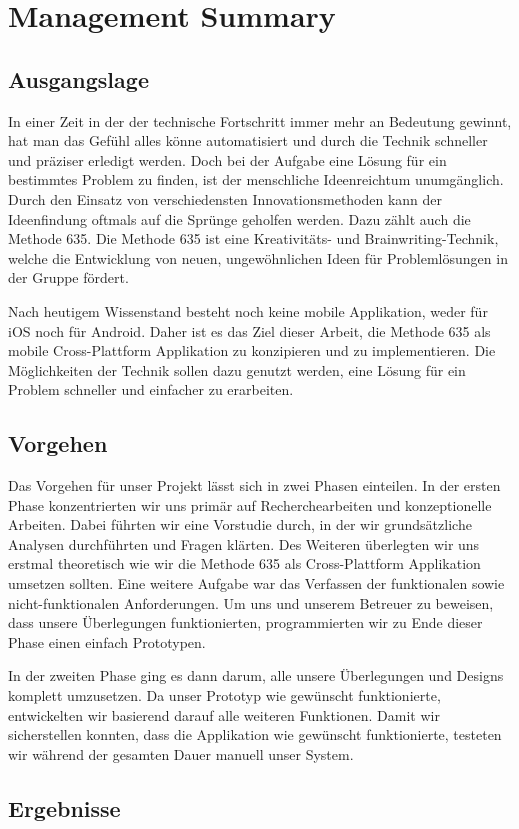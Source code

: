 \section{Management Summary}

\subsection{Ausgangslage}
In einer Zeit in der der technische Fortschritt immer mehr an Bedeutung gewinnt, hat man das Gefühl alles könne automatisiert und durch die Technik schneller und präziser erledigt werden. Doch bei der Aufgabe eine Lösung für ein bestimmtes Problem zu finden, ist der menschliche Ideenreichtum unumgänglich. Durch den Einsatz von verschiedensten Innovationsmethoden kann der Ideenfindung oftmals auf die Sprünge geholfen werden. Dazu zählt auch die Methode 635. Die Methode 635 ist eine Kreativitäts- und Brainwriting-Technik, welche die Entwicklung von neuen, ungewöhnlichen Ideen für Problemlösungen in der Gruppe fördert.

Nach heutigem Wissenstand besteht noch keine mobile Applikation, weder für iOS noch für Android. Daher ist es das Ziel dieser Arbeit, die Methode 635 als mobile Cross-Plattform Applikation zu konzipieren und zu implementieren. Die Möglichkeiten der Technik sollen dazu genutzt werden, eine Lösung für ein Problem schneller und einfacher zu erarbeiten.

\subsection{Vorgehen}
Das Vorgehen für unser Projekt lässt sich in zwei Phasen einteilen. In der ersten Phase konzentrierten wir uns primär auf Recherchearbeiten und konzeptionelle Arbeiten. Dabei führten wir eine Vorstudie durch, in der wir grundsätzliche Analysen durchführten und Fragen klärten. Des Weiteren überlegten wir uns erstmal theoretisch wie wir die Methode 635 als Cross-Plattform Applikation umsetzen sollten. Eine weitere Aufgabe war das Verfassen der funktionalen sowie nicht-funktionalen Anforderungen. Um uns und unserem Betreuer zu beweisen, dass unsere Überlegungen funktionierten, programmierten wir zu Ende dieser Phase einen einfach Prototypen.

In der zweiten Phase ging es dann darum, alle unsere Überlegungen und Designs komplett umzusetzen. Da unser Prototyp wie gewünscht funktionierte, entwickelten wir basierend darauf alle weiteren Funktionen. Damit wir sicherstellen konnten, dass die Applikation wie gewünscht funktionierte, testeten wir während der gesamten Dauer manuell unser System.

\subsection{Ergebnisse}
